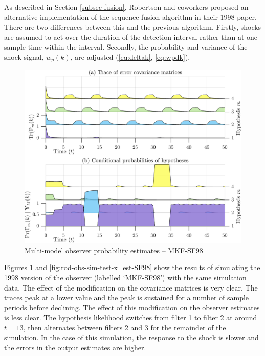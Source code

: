 As described in Section \ref{subsec-fusion}, Robertson and coworkers proposed an alternative implementation of the sequence fusion algorithm in their 1998 paper. There are two differences between this and the previous algorithm. Firstly, shocks are assumed to act over the duration of the detection interval rather than at one sample time within the interval. Secondly, the probability and variance of the shock signal, $w_{p}(k)$, are adjusted (\ref{eq:deltak}, \ref{eq:wpdk}).

\begin{figure}[htp]
	\centering
	\includegraphics[width=12cm]{images/rod_MKF_test_sim_MKF_SF98_prob.png}
	\caption{Multi-model observer probability estimates – MKF-SF98}
	\label{fig:rod-obs-sim-test-probs-SF98}
\end{figure}
Figures \ref{fig:rod-obs-sim-test-probs-SF98} and \ref{fig:rod-obs-sim-test-x_est-SF98} show the results of simulating the 1998 version of the observer (labelled `MKF-SF98') with the same simulation data. The effect of the modification on the covariance matrices is very clear. The traces peak at a lower value and the peak is sustained for a number of sample periods before declining. The effect of this modification on the observer estimates is less clear. The hypothesis likelihood switches from filter 1 to filter 2 at around $t=13$, then alternates between filters 2 and 3 for the remainder of the simulation. In the case of this simulation, the response to the shock is slower and the errors in the output estimates are higher.
